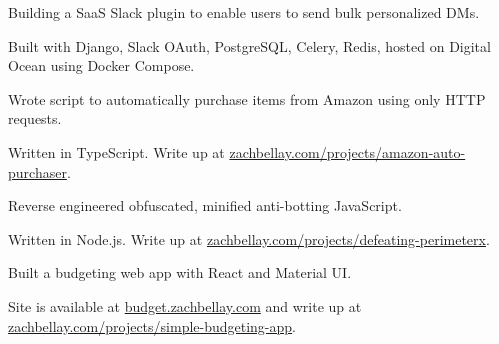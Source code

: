 \documentclass[]{deedy-resume-openfont}
\begin{document}
\hfill{}

\begin{tightemize}
\item Building a SaaS Slack plugin to enable users to send bulk personalized DMs.
\item Built with Django, Slack OAuth, PostgreSQL, Celery, Redis, hosted on Digital Ocean using Docker Compose.
\end{tightemize}
\sectionsep

\hfill{}

\begin{tightemize}
\item Wrote script to automatically purchase items from Amazon using only HTTP requests.
\item Written in TypeScript. Write up at \href{https://zachbellay.com/projects/amazon-auto-purchaser}{zachbellay.com/projects/amazon-auto-purchaser}.
\end{tightemize}
\sectionsep

\hfill{}

\begin{tightemize}
\item Reverse engineered obfuscated, minified anti-botting JavaScript.
\item Written in Node.js. Write up at \href{https://zachbellay.com/projects/defeating-perimeterx}{zachbellay.com/projects/defeating-perimeterx}.
\end{tightemize}
\sectionsep

\hfill{}

\begin{tightemize}
\item Built a budgeting web app with React and Material UI.
\item Site is available at \href{https://budget.zachbellay.com}{budget.zachbellay.com} and write up at \href{https://zachbellay.com/projects/simple-budgeting-app}{zachbellay.com/projects/simple-budgeting-app}.
\end{tightemize}
\sectionsep
\end{document}
